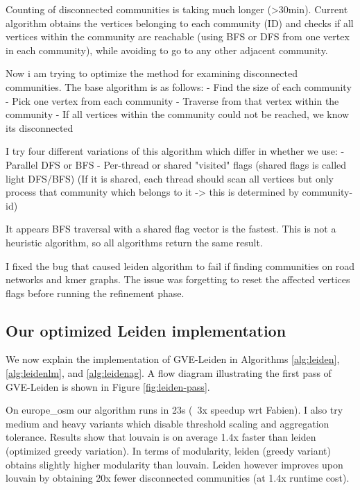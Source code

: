 

Counting of disconnected communities is taking much longer (>30min). Current algorithm obtains the vertices belonging to each community (ID) and checks if all vertices within the community are reachable (using BFS or DFS from one vertex in each community), while avoiding to go to any other adjacent community.

Now i am trying to optimize the method for examining disconnected communities.
The base algorithm is as follows:
- Find the size of each community
- Pick one vertex from each community
- Traverse from that vertex within the community
- If all vertices within the community could not be reached, we know its disconnected

I try four different variations of this algorithm which differ in whether we use:
- Parallel DFS or BFS
- Per-thread or shared "visited" flags (shared flags is called light DFS/BFS)
(If it is shared, each thread should scan all vertices but only process that community which belongs to it -> this is determined by community-id)

It appears BFS traversal with a shared flag vector is the fastest. This is not a heuristic algorithm, so all algorithms return the same result.




I fixed the bug that caused leiden algorithm to fail if finding communities on road networks and kmer graphs. The issue was forgetting to reset the affected vertices flags before running the refinement phase.




\subsection{Our optimized Leiden implementation}

We now explain the implementation of GVE-Leiden in Algorithms \ref{alg:leiden}, \ref{alg:leidenlm}, and \ref{alg:leidenag}. A flow diagram illustrating the first pass of GVE-Leiden is shown in Figure \ref{fig:leiden-pass}.


On europe\_osm our algorithm runs in 23s (~3x speedup wrt Fabien). I also try medium and heavy variants which disable threshold scaling and aggregation tolerance. Results show that louvain is on average 1.4x faster than leiden (optimized greedy variation). In terms of modularity, leiden (greedy variant) obtains slightly higher modularity than louvain. Leiden however improves upon louvain by obtaining 20x fewer disconnected communities (at 1.4x runtime cost).


